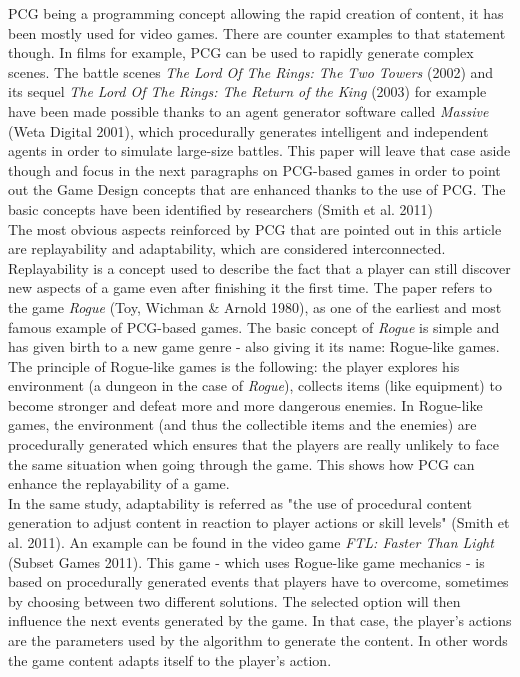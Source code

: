 PCG being a programming concept allowing the rapid creation of content, it has been mostly used for video games. There are counter examples to that statement though. In films for example, PCG can be used to rapidly generate complex scenes. The battle scenes \textit{The Lord Of The Rings: The Two Towers} (2002) and its sequel \textit{The Lord Of The Rings: The Return of the King} (2003) for example have been made possible thanks to an agent generator software called \textit{Massive} (Weta Digital 2001), which procedurally generates intelligent and independent agents in order to simulate large-size battles. This paper will leave that case aside though and focus in the next paragraphs on PCG-based games in order to point out the Game Design concepts that are enhanced thanks to the use of PCG. The basic concepts have been identified by researchers (Smith et al. 2011)\\
The most obvious aspects reinforced by PCG that are pointed out in this article are replayability and adaptability, which are considered interconnected.\\
Replayability is a concept used to describe the fact that a player can still discover new aspects of a game even after finishing it the first time. The paper refers to the game \textit{Rogue} (Toy, Wichman \& Arnold 1980), as one of the earliest and most famous example of PCG-based games. The basic concept of \textit{Rogue} is simple and has given birth to a new game genre - also giving it its name: Rogue-like games. The principle of Rogue-like games is the following: the player explores his environment (a dungeon in the case of \textit{Rogue}), collects items (like equipment) to become stronger and defeat more and more dangerous enemies. In Rogue-like games, the environment (and thus the collectible items and the enemies) are procedurally generated which ensures that the players are really unlikely to face the same situation when going through the game. This shows how PCG can enhance the replayability of a game.\\ 
In the same study, adaptability is referred as "the use of procedural content generation to adjust content in reaction to player actions or skill levels" (Smith et al. 2011). An example can be found in the video game \textit{FTL: Faster Than Light} (Subset Games 2011). This game - which uses Rogue-like game mechanics - is based on procedurally generated events that players   have to overcome, sometimes by choosing between two different solutions. The selected option will then influence the next events generated by the game. In that case, the player's actions are the parameters used by the algorithm to generate the content. In other words the game content adapts itself to the player's action.\\

